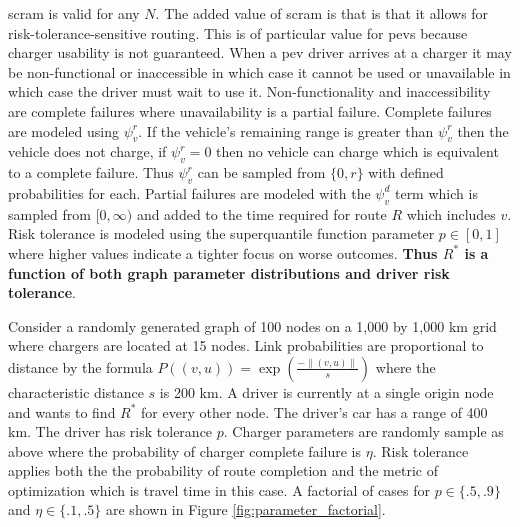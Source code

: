 \gls{scram} is valid for any $N$. The added value of \gls{scram} is that is that it allows for risk-tolerance-sensitive routing. This is of particular value for \glspl{pev} because charger usability is not guaranteed. When a \gls{pev} driver arrives at a charger it may be non-functional or inaccessible in which case it cannot be used or unavailable in which case the driver must wait to use it. Non-functionality and inaccessibility are complete failures where unavailability is a partial failure. Complete failures are modeled using $\psi_v^r$. If the vehicle's remaining range is greater than $\psi_v^r$ then the vehicle does not charge, if $\psi_v^r = 0$ then no vehicle can charge which is equivalent to a complete failure. Thus $\psi_v^r$ can be sampled from $\{0, r\}$ with defined probabilities for each. Partial failures are modeled with the $\psi_v^d$ term which is sampled from $[0, \infty)$ and added to the time required for route $R$ which includes $v$. Risk tolerance is modeled using the superquantile function parameter $p \in [0, 1]$ where higher values indicate a tighter focus on worse outcomes. \textbf{Thus $R^*$ is a function of both graph parameter distributions and driver risk tolerance}.

Consider a randomly generated graph of 100 nodes on a 1,000 by 1,000 km grid where chargers are located at 15 nodes. Link probabilities are proportional to distance by the formula $P((v, u)) = \exp(\frac{-\rVert(v, u)\rVert}{s})$ where the characteristic distance $s$ is 200 km. A driver is currently at a single origin node and wants to find $R^*$ for every other node. The driver's car has a range of 400 km. The driver has risk tolerance $p$. Charger parameters are randomly sample as above where the probability of charger complete failure is $\eta$. Risk tolerance applies both the the probability of route completion and the metric of optimization which is travel time in this case. A factorial of cases for $p \in \{.5, .9\}$ and $\eta \in \{.1, .5\}$ are shown in Figure \ref{fig:parameter_factorial}.

